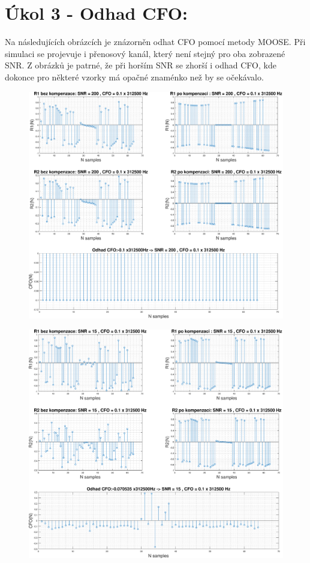 \documentclass[10pt, a4paper]{article}%
\begin{document}
    \section{\Large Úkol 3 - Odhad CFO:}
    Na následujících obrázcích je znázorněn odhat CFO pomocí metody MOOSE. Při simulaci se projevuje i přenosový kanál, který
    není stejný pro oba zobrazené SNR. Z obrázků je patrné, že při horším SNR se zhorší i odhad CFO, kde dokonce pro některé
    vzorky má opačné znaménko než by se očekávalo.

    \begin{figure}[ht!]
        \centering
        \includegraphics[height = 0.45\textheight]{cviceni/SNR_200.eps}
    \end{figure}

    \begin{figure}[ht!]
        \centering
        \includegraphics[height = 0.45\textheight]{cviceni/SNR_15.eps}
    \end{figure}
\end{document}
